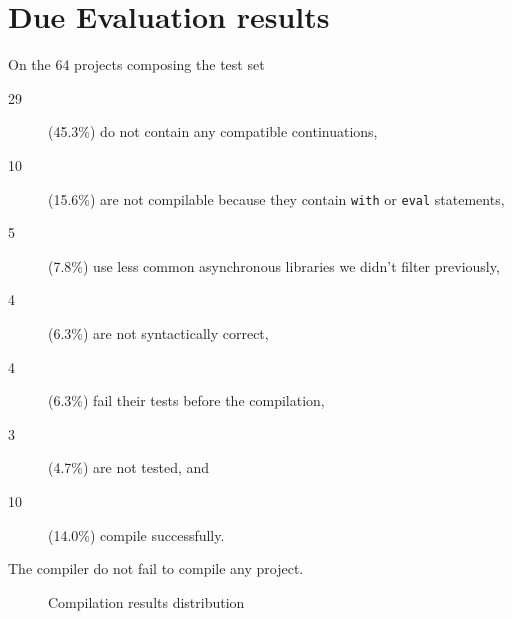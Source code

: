 \appendix

\section{Due Evaluation results} \label{section:results}

On the 64 projects composing the test set
\begin{description}
\item[29] (45.3\%) do not contain any compatible continuations,
\item[10] (15.6\%) are not compilable because they contain \texttt{with} or \texttt{eval} statements,
\item[5] (7.8\%) use less common asynchronous libraries we didn't filter previously,
\item[4] (6.3\%) are not syntactically correct,
\item[4] (6.3\%) fail their tests before the compilation,
\item[3] (4.7\%) are not tested, and
\item[10] (14.0\%) compile successfully.
\end{description}
The compiler do not fail to compile any project.

\begin{figure}[h!]
\caption{Compilation results distribution}
\end{figure}

